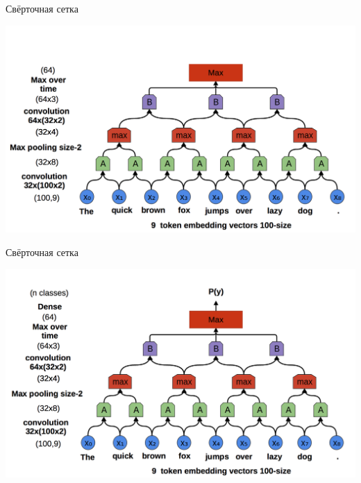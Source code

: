 \documentclass[notes,12pt, aspectratio=169]{beamer}
\newenvironment{transitionframe}{
  \setbeamercolor{background canvas}{bg=yellow}
  \begin{frame}}{
    \end{frame}
}
\begin{document}
\begin{frame}{Свёрточная сетка}
\begin{center}
	\includegraphics[width=.75\linewidth]{conv4.png}
\end{center}
\end{frame} 


\begin{frame}{Свёрточная сетка}
\begin{center}
	\includegraphics[width=.75\linewidth]{conv5.png}
\end{center}
\end{frame} 
%
%



\end{document}
